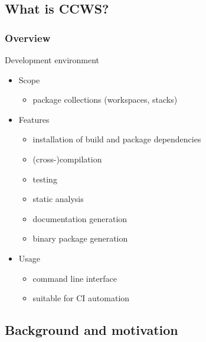 \documentclass[hyperref={colorlinks=false, breaklinks=true},11pt]{beamer}
\begin{document}
\subsection{What is CCWS?}
\begin{frame}
    \frametitle{Overview}


    \begin{block}{Development environment}
        \begin{itemize}
            \item[] Scope
                \begin{itemize}
                    \item package collections (workspaces, stacks)
                \end{itemize}

            \item[] Features
                \begin{itemize}
                    \item installation of build and package dependencies
                    \item (cross-)compilation
                    \item testing
                    \item static analysis
                    \item documentation generation
                    \item binary package generation
                \end{itemize}

            \item[] Usage
                \begin{itemize}
                    \item command line interface
                    \item suitable for CI automation
                \end{itemize}
        \end{itemize}
    \end{block}
\end{frame}


\subsection{Background and motivation}
\end{document}
